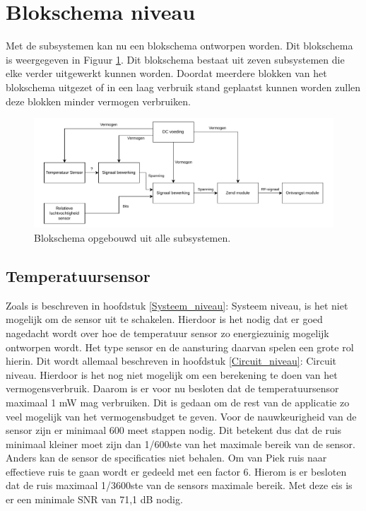 \newpage
\section{Blokschema niveau}
\label{Block_schema}
Met de subsystemen kan nu een blokschema ontworpen worden. Dit blokschema is weergegeven in Figuur \ref{fig:Blok_schema_1_top_level}. Dit blokschema bestaat uit zeven subsystemen die elke verder uitgewerkt kunnen worden. Doordat meerdere blokken van het blokschema uitgezet of in een laag verbruik stand geplaatst kunnen worden zullen deze blokken minder vermogen verbruiken.

\begin{figure}[H]
    \centering
    \includegraphics[width=0.85\linewidth]{pictures/Blok_schema_systeem_ontwerp_1.drawio.pdf}
    \caption{Blokschema opgebouwd uit alle subsystemen.}
    \label{fig:Blok_schema_1_top_level}
\end{figure}

\subsection{Temperatuursensor}
Zoals is beschreven in hoofdstuk \ref{Systeem_niveau}: Systeem niveau, is het niet mogelijk om de sensor uit te schakelen. Hierdoor is het nodig dat er goed nagedacht wordt over hoe de temperatuur sensor zo energiezuinig mogelijk ontworpen wordt. Het type sensor en de aansturing daarvan spelen een grote rol hierin. Dit wordt allemaal beschreven in hoofdstuk \ref{Circuit_niveau}: Circuit niveau. Hierdoor is het nog niet mogelijk om een berekening te doen van het vermogensverbruik. Daarom is er voor nu besloten dat de temperatuursensor maximaal 1 mW mag verbruiken. Dit is gedaan om de rest van de applicatie zo veel mogelijk van het vermogensbudget te geven. Voor de nauwkeurigheid van de sensor zijn er minimaal 600 meet stappen nodig. Dit betekent dus dat de ruis minimaal kleiner moet zijn dan 1/600ste van het maximale bereik van de sensor. Anders kan de sensor de specificaties niet behalen. Om van Piek ruis naar effectieve ruis te gaan wordt er gedeeld met een factor 6. Hierom is er besloten dat de ruis maximaal 1/3600ste van de sensors maximale bereik. Met deze eis is er een minimale SNR van 71,1 dB nodig. 

